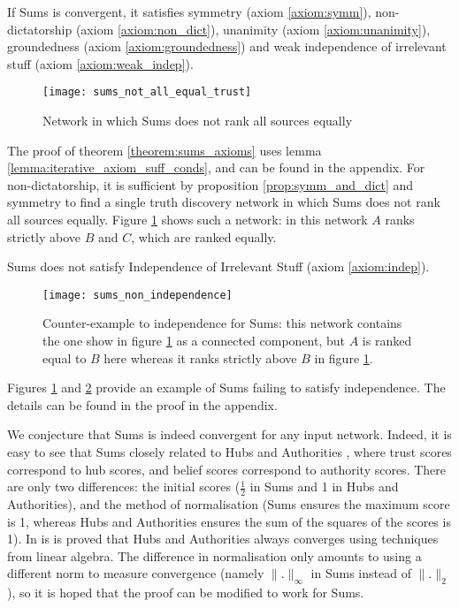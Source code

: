 \documentclass[../main.tex]{subfiles}
\begin{document}
\begin{theorem}
\label{theorem:sums_axioms}
If Sums is convergent, it satisfies symmetry (axiom \ref{axiom:symm}),
non-dictatorship (axiom \ref{axiom:non_dict}), unanimity (axiom
\ref{axiom:unanimity}), groundedness (axiom \ref{axiom:groundedness}) and
weak independence of irrelevant stuff (axiom \ref{axiom:weak_indep}).
\end{theorem}

\begin{figure}
    \centering
    \texttt{[image: sums\_not\_all\_equal\_trust]}
    \caption{Network in which Sums does not rank all sources equally}
    \label{img:sums_not_all_equal_trust}
\end{figure}

The proof of theorem \ref{theorem:sums_axioms} uses lemma
\ref{lemma:iterative_axiom_suff_conds}, and can be found in the appendix. For
non-dictatorship, it is sufficient by proposition \ref{prop:symm_and_dict} and
symmetry to find a single truth discovery network in which Sums does not rank
all sources equally. Figure \ref{img:sums_not_all_equal_trust} shows such a
network: in this network $A$ ranks strictly above $B$ and $C$, which are ranked
equally.

\begin{theorem}
\label{theorem:sums_non_indep}
Sums does not satisfy Independence of Irrelevant Stuff (axiom
\ref{axiom:indep}).
\end{theorem}

\begin{figure}
    \centering
    \texttt{[image: sums\_non\_independence]}
    \caption{
        Counter-example to independence for Sums: this network contains the one
        show in figure \ref{img:sums_not_all_equal_trust} as a connected
        component, but $A$ is ranked equal to $B$ here whereas it ranks
        strictly above $B$ in figure \ref{img:sums_not_all_equal_trust}.
    }
    \label{img:sums_non_indep}
\end{figure}

Figures \ref{img:sums_not_all_equal_trust} and \ref{img:sums_non_indep}
provide an example of Sums failing to satisfy independence. The details can be
found in the proof in the appendix.

We conjecture that Sums is indeed convergent for any input network. Indeed, it
is easy to see that Sums closely related to Hubs and Authorities
\cite{kleinberg}, where trust scores correspond to hub scores, and belief
scores correspond to authority scores. There are only two differences: the
initial scores ($\frac{1}{2}$ in Sums and 1 in Hubs and Authorities), and the
method of normalisation (Sums ensures the maximum score is 1, whereas Hubs and
Authorities ensures the sum of the squares of the scores is 1). In
\cite{kleinberg} is is proved that Hubs and Authorities always converges using
techniques from linear algebra. The difference in normalisation only amounts to
using a different norm to measure convergence (namely $\|.\|_{\infty}$ in Sums
instead of $\|.\|_2$), so it is hoped that the proof can be modified to work
for Sums.
\end{document}
